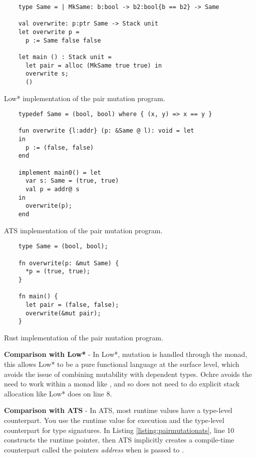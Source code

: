 \documentclass[12pt,twoside]{report}
\begin{document}
\begin{listing}
  \begin{verbatim}
    type Same = | MkSame: b:bool -> b2:bool{b == b2} -> Same

    val overwrite: p:ptr Same -> Stack unit
    let overwrite p =
      p := Same false false
      
    let main () : Stack unit =
      let pair = alloc (MkSame true true) in
      overwrite s;
      ()
  \end{verbatim}
  \caption{Low* implementation of the pair mutation program.}
  \label{listing:pairmutationlowstar}
\end{listing}

\begin{listing}
  \begin{verbatim}
    typedef Same = (bool, bool) where { (x, y) => x == y }

    fun overwrite {l:addr} (p: &Same @ l): void = let
    in
      p := (false, false)
    end

    implement main0() = let
      var s: Same = (true, true)
      val p = addr@ s
    in
      overwrite(p);
    end
  \end{verbatim}
  \caption{ATS implementation of the pair mutation program.}
  \label{listing:pairmutationats}
\end{listing}

\begin{listing}
  \begin{verbatim}
    type Same = (bool, bool);

    fn overwrite(p: &mut Same) {
      *p = (true, true);
    }

    fn main() {
      let pair = (false, false);          
      overwrite(&mut pair);
    }
  \end{verbatim}
  \caption{Rust implementation of the pair mutation program.}
  \label{listing:pairmutationrust}
\end{listing}

\textbf{Comparison with Low*} - In Low*, mutation is handled through the  monad, this allows Low* to be a pure functional language at the surface level, which avoids the issue of combining mutability with dependent types. Ochre avoids the need to work within a monad like , and so does not need to do explicit stack allocation like Low* does on line 8.

\textbf{Comparison with ATS} - In ATS, most runtime values have a type-level counterpart. You use the runtime value for execution and the type-level counterpart for type signatures. In Listing \ref{listing:pairmutationats}, line 10 constructs the runtime pointer, then ATS implicitly creates a compile-time counterpart called the pointers \textit{address} when  is passed to .
\end{document}
